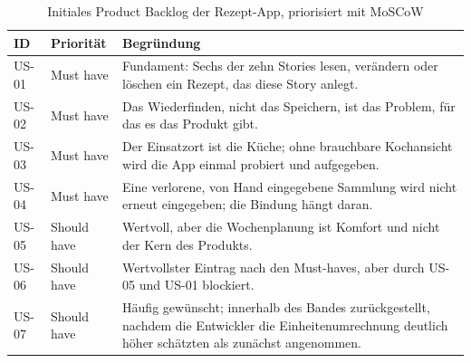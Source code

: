 \begin{table}[H]
  \centering
  \caption{Initiales Product Backlog der Rezept-App, priorisiert mit MoSCoW}
  \label{tab:initial-backlog}
  \tablefontsize
  \begin{tabular}{@{}p{1.2cm}p{2.6cm}p{10.5cm}@{}}
    \toprule
    \textbf{ID} & \textbf{Priorität} & \textbf{Begründung} \\
    \midrule
    US-01 & Must have   & Fundament: Sechs der zehn Stories lesen, verändern oder
                          löschen ein Rezept, das diese Story anlegt. \\
    US-02 & Must have   & Das Wiederfinden, nicht das Speichern, ist das Problem,
                          für das es das Produkt gibt. \\
    US-03 & Must have   & Der Einsatzort ist die Küche; ohne brauchbare
                          Kochansicht wird die App einmal probiert und
                          aufgegeben. \\
    US-04 & Must have   & Eine verlorene, von Hand eingegebene Sammlung wird
                          nicht erneut eingegeben; die Bindung hängt daran. \\
    US-05 & Should have & Wertvoll, aber die Wochenplanung ist Komfort und nicht
                          der Kern des Produkts. \\
    US-06 & Should have & Wertvollster Eintrag nach den Must-haves, aber durch
                          US-05 und US-01 blockiert. \\
    US-07 & Should have & Häufig gewünscht; innerhalb des Bandes zurückgestellt,
                          nachdem die Entwickler die Einheitenumrechnung deutlich
                          höher schätzten als zunächst angenommen. \\

\end{tabular}
\end{table}

